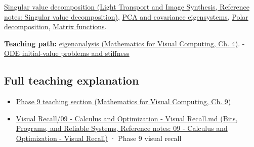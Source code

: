 \href{../04-Light-Transport-and-Image-Synthesis/main.pdf\#nameddest=appendix-1fad5e7f36fa}{Singular value decomposition (Light Transport and Image Synthesis, Reference notes: Singular value decomposition)}, \hyperref[appendix-ad175ef3c5bf]{PCA and covariance eigensystems}, \hyperref[appendix-73f5bcf7a462]{Polar decomposition}, \hyperref[appendix-0f4bc2bf2b1f]{Matrix functions}.

\textbf{Teaching path:} \href{../02-Mathematics-for-Visual-Computing/main.pdf\#nameddest=01-foundations-i-ch020-eigenvectors-reveal-the-directions-a-square-map-does-not-turn}{eigenanalysis (Mathematics for Visual Computing, Ch. 4)}. - \hyperref[appendix-e8ab9836882e]{ODE initial-value problems and stiffness}

\subsection{Full teaching explanation}\label{appendix-0b3be18411f9-full-teaching-explanation}

\begin{itemize}
\tightlist
\item
  \href{../02-Mathematics-for-Visual-Computing/main.pdf\#nameddest=02-foundations-ii-ch025-odes-and-numerical-simulation}{Phase 9 teaching section (Mathematics for Visual Computing, Ch. 9)}
\item
  \href{../01-Bits-Programs-and-Reliable-Systems/main.pdf\#nameddest=appendix-adf48f5dc5c1}{Visual Recall/09 - Calculus and Optimization - Visual Recall.md (Bits, Programs, and Reliable Systems, Reference notes: 09 - Calculus and Optimization - Visual Recall)} · Phase 9 visual recall
\end{itemize}
